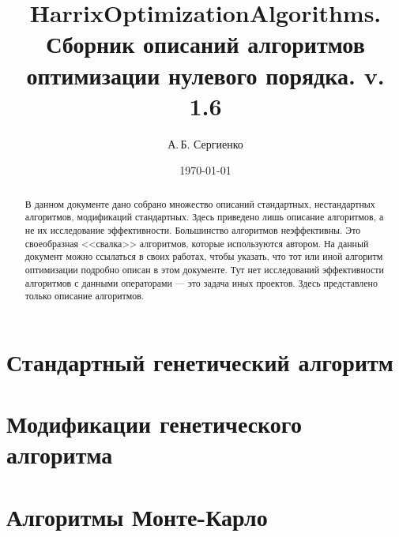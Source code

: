 \documentclass[a4paper,12pt]{article}
\title{HarrixOptimizationAlgorithms. Сборник описаний алгоритмов оптимизации нулевого порядка. v. 1.6}
\author{А.\,Б. Сергиенко}
\date{\today}
\begin{document}


\maketitle

\begin{abstract}
В данном документе дано собрано множество описаний стандартных, нестандартных алгоритмов, модификаций стандартных. Здесь приведено лишь описание алгоритмов, а не их исследование эффективности. Большинство алгоритмов неэффективны. Это своеобразная <<свалка>>  алгоритмов, которые используются автором. На данный документ можно ссылаться в своих работах, чтобы указать, что тот или иной алгоритм оптимизации подробно описан в этом документе. Тут нет исследований эффективности алгоритмов с данными операторами --- это задача иных проектов. Здесь представлено только описание алгоритмов.
\end{abstract}

\tableofcontents

\newpage









\section{Стандартный генетический алгоритм}\label{HarrixOptimizationAlgorithms:GA}




\section{Модификации генетического алгоритма}\label{HarrixOptimizationAlgorithms:ModGA}












\section{Алгоритмы Монте-Карло}\label{HarrixOptimizationAlgorithms:MonteCarlo}




\newpage
\end{document}
